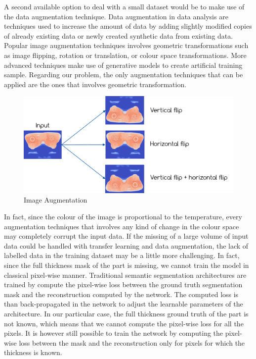 A second available option to deal with a small dataset would be to make use of the data augmentation technique. Data augmentation in data analysis are techniques used to increase the amount of data by adding slightly modified copies of already existing data or newly created synthetic data from existing data. Popular image augmentation techniques involves geometric transformations such as image flipping, rotation or translation, or colour space transformations. More advanced techniques make use of generative models to create artificial training sample. Regarding our problem, the only augmentation techniques that can be applied are the ones that involves geometric transformation. 
\begin{figure}
\centering
\includegraphics[scale=0.8]{images/chapter_4/data_augmentation.png}
\caption{Image Augmentation}
\label{fig:image_augmentation}
\end{figure}

In fact, since the colour of the image is proportional to the temperature, every augmentation techniques that involves any kind of change in the colour space may completely corrupt the input data.
If the missing of a large volume of input data could be handled with transfer learning and data augmentation, the lack of labelled data in the training dataset may be a little more challenging. In fact, since the full thickness mask of the part is missing, we cannot train the model in classical pixel-wise manner. Traditional semantic segmentation architectures are trained by compute the pixel-wise loss between the ground truth segmentation mask and the reconstruction computed by the network. The computed loss is than back-propagated in the network to adjust the learnable parameters of the architecture. In our particular case, the full thickness ground truth of the part is not known, which means that we cannot compute the pixel-wise loss for all the pixels. It is however still possible to train the network by computing the pixel-wise loss between the mask and the reconstruction only for pixels for which the thickness is known.

